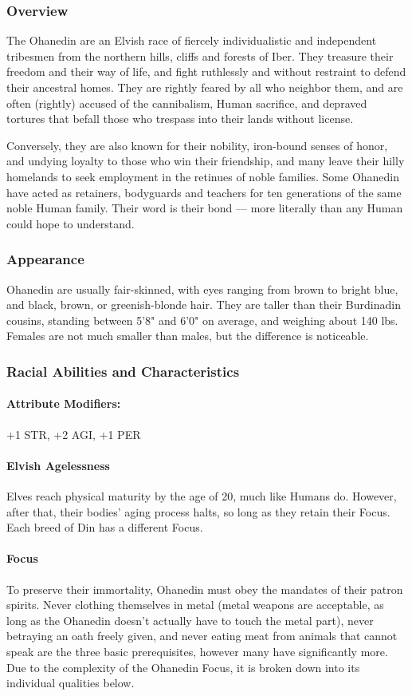 \documentclass[oneside,11pt,english]{book}
\begin{document}
\subsubsection*{Overview} 
The Ohanedin are an Elvish race of fiercely individualistic and independent tribesmen from the northern 
hills, cliffs and forests of Iber. They treasure their freedom and their way of life, and fight ruthlessly and 
without restraint to defend their ancestral homes. They are rightly feared by all who neighbor them, and 
are often (rightly) accused of the cannibalism, Human sacrifice, and depraved tortures that befall those 
who trespass into their lands without license. 


Conversely, they are also known for their nobility, iron-bound senses of honor, and undying loyalty to those who win their friendship, and many leave their hilly homelands to seek employment in the retinues of noble families. Some Ohanedin have acted as retainers, bodyguards and teachers for ten generations of the same noble Human family. Their word is their bond — more literally than any Human could hope to understand. 
\subsubsection*{Appearance} 
Ohanedin are usually fair-skinned, with eyes ranging from brown to bright blue, and black, brown, or 
greenish-blonde hair. They are taller than their Burdinadin cousins, standing between 5'8" and 6'0" on 
average, and weighing about 140 lbs. Females are not much smaller than males, but the difference is 
noticeable. 
\subsubsection*{Racial Abilities and Characteristics} 
\paragraph{Attribute Modifiers:} +1 STR, +2 AGI, +1 PER 
\paragraph{Elvish Agelessness}
Elves reach physical maturity by the age of 20, much like Humans do. However, after that, their bodies' aging process halts, so long as they retain their Focus. Each breed of Din has a different Focus. 
\paragraph{Focus}
To preserve their immortality, Ohanedin must obey the mandates of their patron spirits. Never clothing themselves in metal (metal weapons are acceptable, as long as the Ohanedin doesn't actually have to touch the metal part), never betraying an oath freely given, and never eating meat from animals that cannot speak are the three basic prerequisites, however many have significantly more. Due to the complexity of the Ohanedin Focus, it is broken down into its individual qualities below. 
\end{document}
